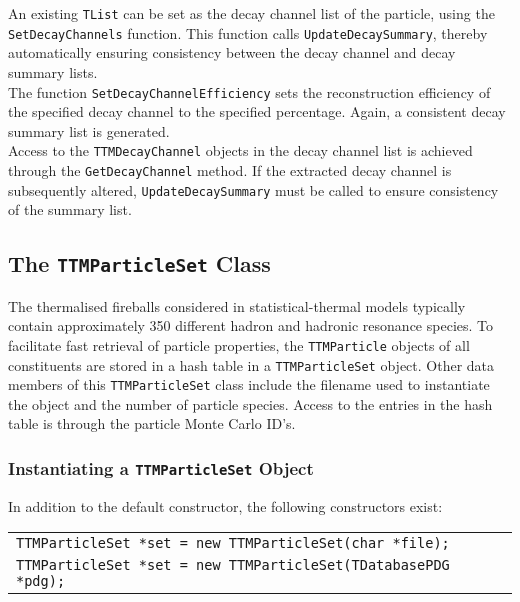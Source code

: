 \documentclass{elsarticle}
\begin{document}
An existing \texttt{TList} can be set as the decay channel list of the particle, 
using the \texttt{SetDecayChannels} function. This function calls
\texttt{UpdateDecaySummary}, thereby automatically ensuring consistency between
the decay channel and decay summary lists.\\

The function \texttt{SetDecayChannelEfficiency} sets 
the reconstruction efficiency of the specified
decay channel to the specified percentage. Again, a consistent decay summary list 
is generated.\\
 
Access to the \texttt{TTMDecayChannel} objects in the decay channel list is achieved 
through the \texttt{GetDecayChannel} method. If the extracted decay channel 
is subsequently altered, \texttt{UpdateDecaySummary} must be called to
ensure consistency of the summary list.\\

\subsection{The \texttt{TTMParticleSet} Class}

The thermalised fireballs considered in statistical-thermal models typically contain 
approximately 350 different hadron and hadronic resonance species. To facilitate fast 
retrieval of particle properties, the \texttt{TTMParticle} objects of all constituents 
are stored in a hash table 
in a \texttt{TTMParticleSet} object. Other data members of this \texttt{TTMParticleSet} class 
include the filename used to instantiate the object and the number of particle species. 
Access to the entries in the hash table is through the particle Monte Carlo ID's.\\ 

\subsubsection{Instantiating a \texttt{TTMParticleSet} Object}

In addition to the default constructor, the following constructors exist:

\begin{center}
\begin{tabular}{l}
\texttt{TTMParticleSet *set = new TTMParticleSet(char *file);}\\
\texttt{TTMParticleSet *set = new TTMParticleSet(TDatabasePDG *pdg);}
\end{tabular}
\end{center}
 
\end{document}
